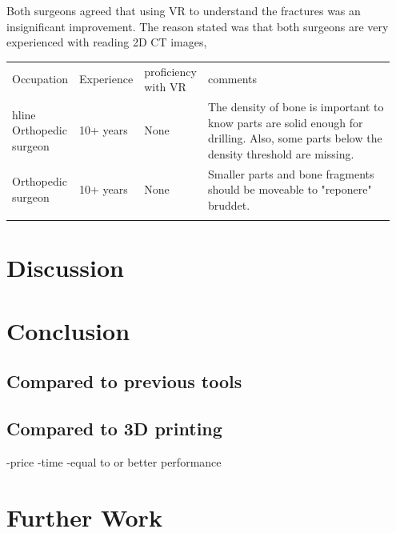 \documentclass[a4paper]{report}
\begin{document}
Both surgeons agreed that using VR to understand the fractures was an insignificant improvement.
The reason stated was that both surgeons are very experienced with reading 2D CT images, 

\begin{table}[ht]
\begin{tabular}{p{0.15\linewidth} |p{0.15\linewidth} |p{0.15\linewidth} | p{0.5\linewidth}}
Occupation         & Experience & proficiency with VR & comments                                                                                                                                \\hline
Orthopedic surgeon & 10+ years  & None                & The density of bone is important to know parts are solid enough for drilling. Also, some parts below the density threshold are missing. \\
Orthopedic surgeon & 10+ years  & None                & Smaller parts and bone fragments should be moveable to "reponere" bruddet.                                                              \\
                   &            &                     &
\end{tabular}
\end{table}


\chapter{Discussion}\label{Discussion}


\chapter{Conclusion} \label{Conclusion}

\section{Compared to previous tools}

\section{Compared to 3D printing}
-price
-time
-equal to or better performance

\chapter{Further Work} \label{Further Work}

\appendix



%
%
\printbibliography
\end{document}

